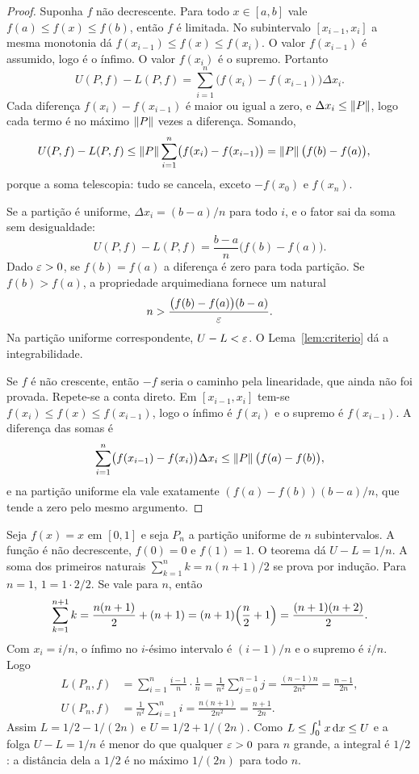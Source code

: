 \documentclass[11pt,a4paper]{article}
\begin{document}
\begin{proof}
Suponha $f$ não decrescente. Para todo $x\in[a,b]$ vale $f(a)\le f(x)\le f(b)$, então $f$ é limitada. No subintervalo $[x_{i-1},x_i]$ a mesma monotonia dá $f(x_{i-1})\le f(x)\le f(x_i)$. O valor $f(x_{i-1})$ é assumido, logo é o ínfimo. O valor $f(x_i)$ é o supremo. Portanto
\[
U(P,f)-L(P,f)
=\sum_{i=1}^n\bigl(f(x_i)-f(x_{i-1})\bigr)\Delta x_i.
\]
Cada diferença $f(x_i)-f(x_{i-1})$ é maior ou igual a zero, e $\Delta x_i\le\left\lVert P \right\rVert$, logo cada termo é no máximo $\left\lVert P \right\rVert$ vezes a diferença. Somando,
\begin{align*}
U(P,f)-L(P,f)
&\le\left\lVert P \right\rVert\sum_{i=1}^n\bigl(f(x_i)-f(x_{i-1})\bigr)
=\left\lVert P \right\rVert\bigl(f(b)-f(a)\bigr),
\end{align*}
porque a soma telescopia: tudo se cancela, exceto $-f(x_0)$ e $f(x_n)$.

Se a partição é uniforme, $\Delta x_i=(b-a)/n$ para todo $i$, e o fator sai da soma sem desigualdade:
\[
U(P,f)-L(P,f)=\frac{b-a}{n}\bigl(f(b)-f(a)\bigr).
\]
Dado $\varepsilon>0$, se $f(b)=f(a)$ a diferença é zero para toda partição. Se $f(b)>f(a)$, a propriedade arquimediana fornece um natural
\[
n>\frac{\bigl(f(b)-f(a)\bigr)(b-a)}{\varepsilon}.
\]
Na partição uniforme correspondente, $U-L<\varepsilon$. O Lema~\ref{lem:criterio} dá a integrabilidade.

Se $f$ é não crescente, então $-f$ seria o caminho pela linearidade, que ainda não foi provada. Repete-se a conta direto. Em $[x_{i-1},x_i]$ tem-se $f(x_i)\le f(x)\le f(x_{i-1})$, logo o ínfimo é $f(x_i)$ e o supremo é $f(x_{i-1})$. A diferença das somas é
\[
\sum_{i=1}^n\bigl(f(x_{i-1})-f(x_i)\bigr)\Delta x_i
\le\left\lVert P \right\rVert\bigl(f(a)-f(b)\bigr),
\]
e na partição uniforme ela vale exatamente $(f(a)-f(b))(b-a)/n$, que tende a zero pelo mesmo argumento.
\end{proof}

\begin{exemplo}
Seja $f(x)=x$ em $[0,1]$ e seja $P_n$ a partição uniforme de $n$ subintervalos. A função é não decrescente, $f(0)=0$ e $f(1)=1$. O teorema dá $U-L=1/n$. A soma dos primeiros naturais $\sum_{k=1}^n k=n(n+1)/2$ se prova por indução. Para $n=1$, $1=1\cdot 2/2$. Se vale para $n$, então
\[
\sum_{k=1}^{n+1}k=\frac{n(n+1)}{2}+(n+1)=(n+1)\Bigl(\frac{n}{2}+1\Bigr)=\frac{(n+1)(n+2)}{2}.
\]
Com $x_i=i/n$, o ínfimo no $i$-ésimo intervalo é $(i-1)/n$ e o supremo é $i/n$. Logo
\begin{align*}
L(P_n,f)
&=\sum_{i=1}^n\frac{i-1}{n}\cdot\frac{1}{n}
=\frac{1}{n^2}\sum_{j=0}^{n-1}j
=\frac{(n-1)n}{2n^2}
=\frac{n-1}{2n},\\[0.3em]
U(P_n,f)
&=\frac{1}{n^2}\sum_{i=1}^n i
=\frac{n(n+1)}{2n^2}
=\frac{n+1}{2n}.
\end{align*}
Assim $L=1/2-1/(2n)$ e $U=1/2+1/(2n)$. Como $L\le\int_0^1 x\,\mathrm{d} x\le U$ e a folga $U-L=1/n$ é menor do que qualquer $\varepsilon>0$ para $n$ grande, a integral é $1/2$: a distância dela a $1/2$ é no máximo $1/(2n)$ para todo $n$.
\end{exemplo}
\end{document}
